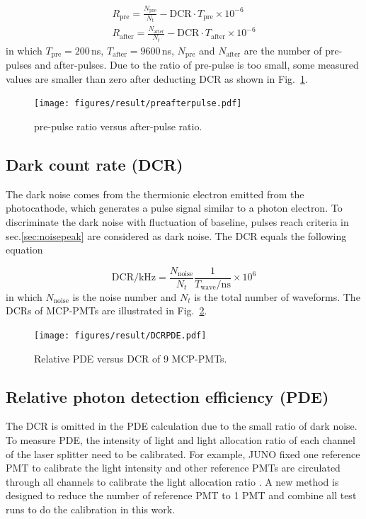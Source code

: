 \begin{align}
    R_{\mathrm{pre}} = \frac{N_{\mathrm{pre}}}{N_t} - \mathrm{DCR}\cdot T_{\mathrm{pre}}\times10^{-6}\\
    R_{\mathrm{after}} = \frac{N_{\mathrm{after}}}{N_t} - \mathrm{DCR}\cdot T_{\mathrm{after}}\times10^{-6}
\end{align}
in which $T_{\mathrm{pre}}=200$\,ns, $T_{\mathrm{after}}=9600$\,ns, $N_{\mathrm{pre}}$ and $N_{\mathrm{after}}$ are the number of pre-pulses and after-pulses. Due to the ratio of pre-pulse is too small, some measured values are smaller than zero after deducting DCR as shown in Fig.~\ref{fig:prepulseCompare}.

\begin{figure}[!htbp]
    \centering
    \texttt{[image: figures/result/preafterpulse.pdf]}
    \caption{pre-pulse ratio versus after-pulse ratio.}
    \label{fig:prepulseCompare}
\end{figure}
\subsection{Dark count rate (DCR)}
The dark noise comes from the thermionic electron emitted from the photocathode, which generates a pulse signal similar to a photon electron. To discriminate the dark noise with fluctuation of baseline, pulses reach criteria in sec.\ref{sec:noisepeak} are considered as dark noise. The DCR equals the following equation

\begin{equation}
    \mathrm{DCR/kHz} = \frac{N_{\mathrm{noise}}}{N_{t}}\frac{1}{T_{\mathrm{wave}}/\mathrm{ns}}\times 10^{6}
\end{equation}
in which $N_{\mathrm{noise}}$ is the noise number and $N_{t}$ is the total number of waveforms. The DCRs of MCP-PMTs are illustrated in Fig.~\ref{fig:DCRCompare}.

\begin{figure}[!htbp]
    \centering
    \texttt{[image: figures/result/DCRPDE.pdf]}
    \caption{Relative PDE versus DCR of 9 MCP-PMTs.}
    \label{fig:DCRCompare}
\end{figure}

\subsection{Relative photon detection efficiency (PDE)}
The DCR is omitted in the PDE calculation due to the small ratio of dark noise. To measure PDE, the intensity of light and light allocation ratio of each channel of the laser splitter need to be calibrated. For example, JUNO fixed one reference PMT to calibrate the light intensity and other reference PMTs are circulated through all channels to calibrate the light allocation ratio \cite{Wonsak_2021}. A new method is designed to reduce the number of reference PMT to 1 PMT and combine all test runs to do the calibration in this work.

